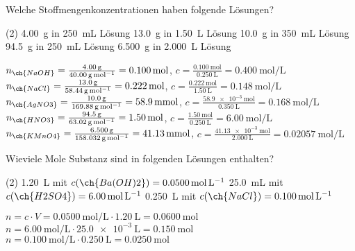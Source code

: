 \documentclass[DIV11,bib=totoc]{scrartcl}
\begin{document}
\begin{question}
Welche Stoffmengenkonzentrationen haben folgende Lösungen?
\begin{tasks}(2)
  \task \SI{4.00}{\gram}  in \SI{250}{\milli\liter} Lösung
  \task \SI{13.0}{\gram}  in \SI{1.50}{\liter} Lösung
  \task \SI{10.0}{\gram}  in \SI{350}{\milli\liter} Lösung
  \task \SI{94.5}{\gram}  in \SI{250}{\milli\liter} Lösung
  \task \SI{6.500}{\gram}  in \SI{2.000}{\liter} Lösung
\end{tasks}
\end{question}
\begin{solution}
\begin{tasks}
  \task $n_{\ch{NaOH}} = \frac{\SI{4.00}{\gram}}{\SI{40.00}{\gram\per\mole}} =
    \SI{0.100}{\mole}$, $c =\frac{\SI{0.100}{\mole}}{\SI{0.250}{\liter}} =
    \SI{0.400}{\mole\per\liter}$
  \task $n_{\ch{NaCl}} = \frac{\SI{13.0}{\gram}}{\SI{58.44}{\gram\per\mole}} =
    \SI{0.222}{\mole}$, $c = \frac{\SI{0.222}{\mole}}{\SI{1.50}{\liter}} =
    \SI{0.148}{\mole\per\liter}$
  \task $n_{\ch{AgNO3}} = \frac{\SI{10.0}{\gram}}{\SI{169.88}{\gram\per\mole}} =
    \SI{58.9}{\milli\mole}$, $c = \frac{\SI{58.9e-3}{\mole}}{\SI{0.350}{\liter}}
    = \SI{0.168}{\mole\per\liter}$
  \task $n_{\ch{HNO3}} = \frac{\SI{94.5}{\gram}}{\SI{63.02}{\gram\per\mole}} =
    \SI{1.50}{\mole}$, $ c =\frac{\SI{1.50}\mole}{\SI{0.250}{\liter}} =
    \SI{6.00}{\mole\per\liter}$
  \task $n_{\ch{KMnO4}} = \frac{\SI{6.500}{\gram}}{\SI{158.032}{\gram\per\mole}}
    = \SI{41.13}{\milli\mole}$, $c =
    \frac{\SI{41.13e-3}{\mole}}{\SI{2.000}{\liter}} =
    \SI{0.02057}{\mole\per\liter}$
\end{tasks}
\end{solution}

\begin{question}
Wieviele Mole Substanz sind in folgenden Lösungen enthalten?
\begin{tasks}(2)
  \task \SI{1.20}{\liter} mit $c(\ch{Ba(OH)2}) = \SI{0.0500}{\mole\per\liter}$
  \task \SI{25.0}{\milli\liter} mit $c(\ch{H2SO4}) = \SI{6.00}{\mole\per\liter}$
  \task \SI{0.250}{\liter} mit $c(\ch{NaCl}) = \SI{0.100}{\mole\per\liter}$
\end{tasks}
\end{question}
\begin{solution}
\begin{tasks}
  \task $n = c\cdot V = \SI{0.0500}{\mole\per\liter}\cdot\SI{1.20}{\liter} =
    \SI{0.0600}\mole$
  \task $n = \SI{6.00}{\mole\per\liter}\cdot\SI{25.0e-3}{\liter} =
    \SI{0.150}{\mole}$
  \task $n = \SI{0.100}{\mole\per\liter}\cdot\SI{0.250}{\liter} =
    \SI{0.0250}{\mole}$
\end{tasks}
\end{solution}
\end{document}
